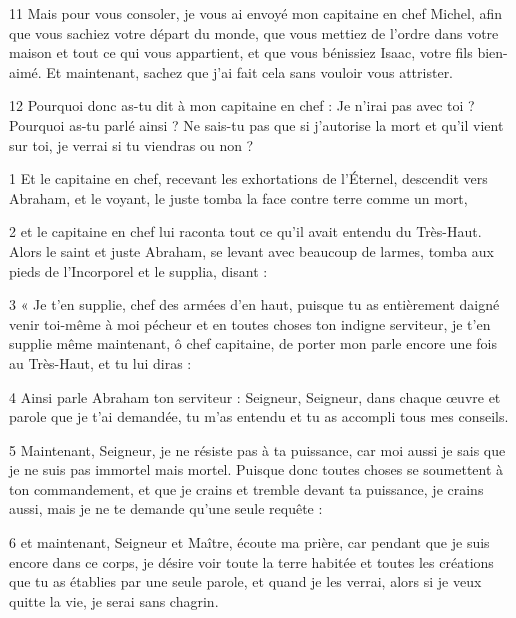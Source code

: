 \par 11 Mais pour vous consoler, je vous ai envoyé mon capitaine en chef Michel, afin que vous sachiez votre départ du monde, que vous mettiez de l'ordre dans votre maison et tout ce qui vous appartient, et que vous bénissiez Isaac, votre fils bien-aimé. Et maintenant, sachez que j'ai fait cela sans vouloir vous attrister.

\par 12 Pourquoi donc as-tu dit à mon capitaine en chef : Je n'irai pas avec toi ? Pourquoi as-tu parlé ainsi ? Ne sais-tu pas que si j'autorise la mort et qu'il vient sur toi, je verrai si tu viendras ou non ?


\par 1 Et le capitaine en chef, recevant les exhortations de l'Éternel, descendit vers Abraham, et le voyant, le juste tomba la face contre terre comme un mort,

\par 2 et le capitaine en chef lui raconta tout ce qu'il avait entendu du Très-Haut. Alors le saint et juste Abraham, se levant avec beaucoup de larmes, tomba aux pieds de l'Incorporel et le supplia, disant :

\par 3 « Je t'en supplie, chef des armées d'en haut, puisque tu as entièrement daigné venir toi-même à moi pécheur et en toutes choses ton indigne serviteur, je t'en supplie même maintenant, ô chef capitaine, de porter mon parle encore une fois au Très-Haut, et tu lui diras :

\par 4 Ainsi parle Abraham ton serviteur : Seigneur, Seigneur, dans chaque œuvre et parole que je t'ai demandée, tu m'as entendu et tu as accompli tous mes conseils.

\par 5 Maintenant, Seigneur, je ne résiste pas à ta puissance, car moi aussi je sais que je ne suis pas immortel mais mortel. Puisque donc toutes choses se soumettent à ton commandement, et que je crains et tremble devant ta puissance, je crains aussi, mais je ne te demande qu'une seule requête :

\par 6 et maintenant, Seigneur et Maître, écoute ma prière, car pendant que je suis encore dans ce corps, je désire voir toute la terre habitée et toutes les créations que tu as établies par une seule parole, et quand je les verrai, alors si je veux quitte la vie, je serai sans chagrin.

